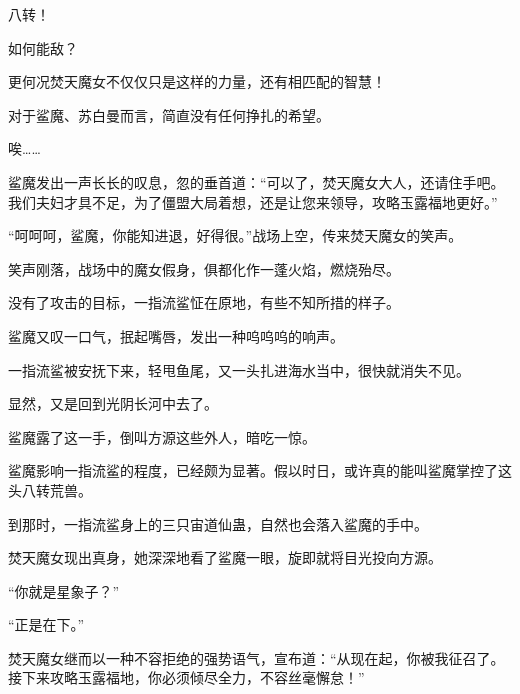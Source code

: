 \begin{this_body}
八转！

如何能敌？

更何况焚天魔女不仅仅只是这样的力量，还有相匹配的智慧！

对于鲨魔、苏白曼而言，简直没有任何挣扎的希望。

唉……

鲨魔发出一声长长的叹息，忽的垂首道：“可以了，焚天魔女大人，还请住手吧。我们夫妇才具不足，为了僵盟大局着想，还是让您来领导，攻略玉露福地更好。”

“呵呵呵，鲨魔，你能知进退，好得很。”战场上空，传来焚天魔女的笑声。

笑声刚落，战场中的魔女假身，俱都化作一蓬火焰，燃烧殆尽。

没有了攻击的目标，一指流鲨怔在原地，有些不知所措的样子。

鲨魔又叹一口气，抿起嘴唇，发出一种呜呜呜的响声。

一指流鲨被安抚下来，轻甩鱼尾，又一头扎进海水当中，很快就消失不见。

显然，又是回到光阴长河中去了。

鲨魔露了这一手，倒叫方源这些外人，暗吃一惊。

鲨魔影响一指流鲨的程度，已经颇为显著。假以时日，或许真的能叫鲨魔掌控了这头八转荒兽。

到那时，一指流鲨身上的三只宙道仙蛊，自然也会落入鲨魔的手中。

焚天魔女现出真身，她深深地看了鲨魔一眼，旋即就将目光投向方源。

“你就是星象子？”

“正是在下。”

焚天魔女继而以一种不容拒绝的强势语气，宣布道：“从现在起，你被我征召了。接下来攻略玉露福地，你必须倾尽全力，不容丝毫懈怠！”

\end{this_body}


